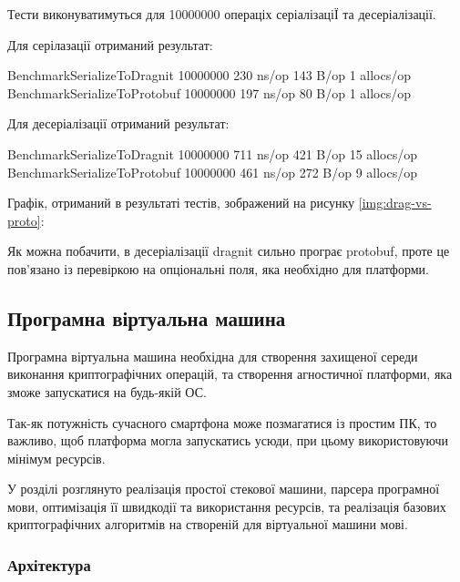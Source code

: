 \documentclass{lib/styles/default-style}
\begin{document}
    Тести виконуватимуться для 10000000 операціх серіалізаціЇ та десеріалізації.

    Для серілазації отриманий результат:

    \begin{snippet}
        BenchmarkSerializeToDragnit     10000000  230 ns/op  143 B/op  1 allocs/op
        BenchmarkSerializeToProtobuf    10000000  197 ns/op  80 B/op   1 allocs/op\end{snippet}

    Для десеріалізації отриманий результат:
    
    \begin{snippet}
        BenchmarkSerializeToDragnit     10000000  711 ns/op  421 B/op  15 allocs/op
        BenchmarkSerializeToProtobuf    10000000  461 ns/op  272 B/op   9 allocs/op\end{snippet}

    Графік, отриманий в результаті тестів, зображений на рисунку \ref{img:drag-vs-proto}:


    Як можна побачити, в десеріалізації dragnit сильно програє protobuf, проте це пов'язано із перевіркою на опціональні поля,
    яка необхідно для платформи.
    
\subsection{Програмна віртуальна машина}

    Програмна віртуальна машина необхідна для створення захищеної середи виконання криптографічних операцій, та 
    створення агностичної платформи, яка зможе запускатися на будь-якій ОС.

    Так-як потужність сучасного смартфона може позмагатися із простим ПК, то важливо, щоб платформа могла запускатись усюди, 
    при цьому використовуючи мінімум ресурсів.

    У розділі розглянуто реалізація простої стекової машини, парсера програмної мови, оптимізація її швидкодії та використання ресурсів, 
    та реалізація базових криптографічних алгоритмів на створеній для віртуальної машини мові. 

    \subsubsection{Архітектура}
\end{document}
